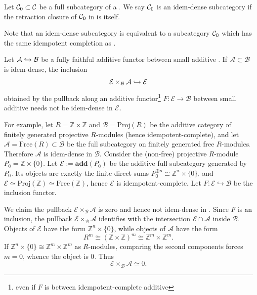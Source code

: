 \documentclass[a4paper,10pt, oneside]{amsart}
\begin{document}
\begin{de}
	Let $\mathcal{C}_0 \subset \mathcal{C}$ be a full subcategory of a \infcat \mcc. We say $\mathcal{C}_0$ is an idem-dense subcategory if the retraction closure of $\mathcal{C}_0$ in \mcc is \mcc itself.
\end{de}
\begin{rem}
	Note that an idem-dense subcategory is equivalent to a subcategory $\mathcal{C}_0$  which has the same idempotent completion as \mcc.
\end{rem}
\begin{exam}\label{densepullback}
	Let $\mathcal{A}\hookrightarrow \mathcal{B}$ be a fully faithful additive functor between small additive \infcats.	If $\mathcal{A} \subset \mathcal{B}$ is idem-dense, the inclusion
	$$
	\mathcal{E} \times_{\mathcal{B}} \mathcal{A}\hookrightarrow\mathcal{E}
	$$
	obtained by the pullback along an additive functor\footnote{even if $F$ is between idempotent-complete additive \infcats} $F \colon \mathcal{E} \to \mathcal{B}$ between small additive \infcats  needs not be idem-dense in $\mathcal{E}$. 
	
	For example, let $R = \mathbb{Z} \times \mathbb{Z}$ and  
$
	\mathcal{B} = \mathrm{Proj}(R)
	$
	be the additive category of finitely generated projective $R$-modules (hence idempotent-complete), and let
	$
	\mathcal{A} = \mathrm{Free}(R) \subset \mathcal{B}
	$
	be the full subcategory on finitely generated free $R$-modules. Therefore $\mathcal{A}$ is idem-dense in $\mathcal{B}$.
	Consider the (non-free) projective $R$-module
	$
	P_0 = \mathbb{Z} \times \{0\}.
	$
	Let
	$
	\mathcal{E} := \mathbf{add}(P_0)
	$
	be the additive full subcategory generated by $P_0$. Its objects are exactly the finite direct sums $P_0^{\oplus n} \cong \mathbb{Z}^n \times \{0\}$, and $\mathcal{E} \simeq \mathrm{Proj}(\mathbb{Z}) \simeq \mathrm{Free}(\mathbb{Z})$, hence $\mathcal{E}$ is idempotent-complete. Let $F \colon \mathcal{E} \hookrightarrow \mathcal{B}$ be the inclusion functor. 
	
	We claim the pullback $\mathcal{E} \times_{\mathcal{B}} \mathcal{A}$ is zero and hence not idem-dense in \mce. Since $F$ is an inclusion, the pullback $\mathcal{E} \times_{\mathcal{B}} \mathcal{A}$ identifies with the intersection $\mathcal{E} \cap \mathcal{A}$ inside $\mathcal{B}$. Objects of $\mathcal{E}$ have the form $\mathbb{Z}^n \times \{0\}$, while objects of $\mathcal{A}$ have the form
	\[
	R^m \cong (\mathbb{Z} \times \mathbb{Z})^m \cong \mathbb{Z}^m \times \mathbb{Z}^m.
	\]
	If $\mathbb{Z}^n \times \{0\} \cong \mathbb{Z}^m \times \mathbb{Z}^m$ as $R$-modules, comparing the second components forces $m=0$, whence the object is $0$. Thus
	\[
	\mathcal{E} \times_{\mathcal{B}} \mathcal{A} \simeq 0.
	\]
	
\end{exam}
\end{document}
